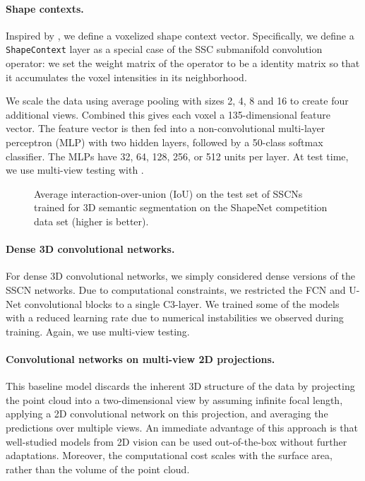 \documentclass[10pt,twocolumn,letterpaper]{article}
\begin{document}
\paragraph{Shape contexts.}
Inspired by \cite{belongie2002shape}, we define a voxelized shape context vector. Specifically, we define a \texttt{ShapeContext} layer as a special case of the SSC submanifold convolution operator: we set the weight matrix of the operator to be a  identity matrix so that it accumulates the voxel intensities in its  neighborhood.

We scale the data using average pooling with sizes 2, 4, 8 and 16 to create four additional views. Combined this gives each voxel a 135-dimensional feature vector. The feature vector is then fed into a non-convolutional multi-layer perceptron (MLP) with two hidden layers, followed by a 50-class softmax classifier. The MLPs have 32, 64, 128, 256, or 512 units per layer. At test time, we use multi-view testing with .

\begin{figure*}[t]
    \centering
    \caption{Average interaction-over-union (IoU) on the test set of SSCNs trained for 3D semantic segmentation on the ShapeNet competition data set (higher is better).}
    \label{fig:results}
\end{figure*}

\paragraph{Dense 3D convolutional networks.}
For dense 3D convolutional networks, we simply considered dense versions of the SSCN networks. Due to computational constraints, we restricted the FCN and U-Net convolutional blocks to a single C3-layer. We trained some of the models with a reduced learning rate due to numerical instabilities we observed during training. Again, we use  multi-view testing.

\paragraph{Convolutional networks on multi-view 2D projections.}
This baseline model discards the inherent 3D structure of the data by projecting the point cloud into a two-dimensional view by assuming infinite focal length, applying a 2D convolutional network on this projection, and averaging the predictions over multiple views. An immediate advantage of this approach is that well-studied models from 2D vision can be used out-of-the-box without further adaptations. Moreover, the computational cost scales with the surface area, rather than the volume of the point cloud.
\end{document}
